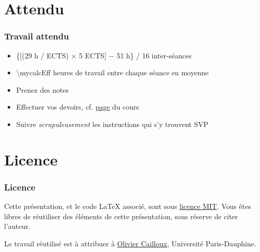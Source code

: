\documentclass[english, french]{beamer}
\begin{document}
\section{Attendu}
\begin{frame}
	\frametitle{Travail attendu}
	\begin{itemize}
		\item \{[(29 h / ECTS) × 5 ECTS] − 51 h\} / 16 inter-séances
		\item \num[round-mode=places, round-precision=0, mode=text]{\mycalcEff} heures de travail entre chaque séance en moyenne
		\item Prenez des notes
		\item Effectuer vos devoirs, cf. \href{https://github.com/oliviercailloux/java-course/blob/master/Divers/L3a.adoc}{page} du cours
		\item Suivre \emph{scrupuleusement} les instructions qui s’y trouvent SVP
	\end{itemize}
\end{frame}

\appendix
\section{Licence}
\begin{frame}
	\frametitle{Licence}
	Cette présentation, et le code LaTeX associé, sont sous \href{https://opensource.org/licenses/MIT}{licence MIT}. Vous êtes libres de réutiliser des éléments de cette présentation, sous réserve de citer l’auteur.
	
	Le travail réutilisé est à attribuer à \href{http://www.lamsade.dauphine.fr/~ocailloux/}{Olivier Cailloux}, Université Paris-Dauphine.
\end{frame}
\end{document}
